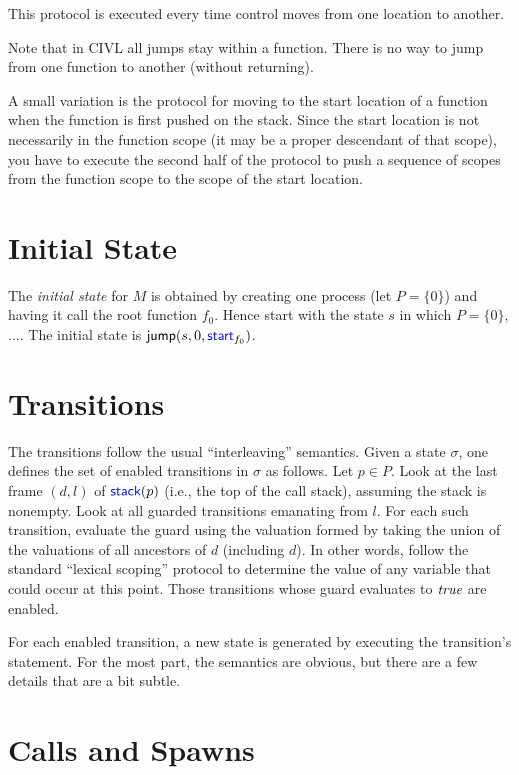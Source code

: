 This protocol is executed every time control moves from one location
to another.

Note that in CIVL all jumps stay within a function.  There is no
way to jump from one function to another (without returning).

A small variation is the protocol for moving to the start location of
a function when the function is first pushed on the stack. Since the
start location is not necessarily in the function scope (it may be a
proper descendant of that scope), you have to execute the second half
of the protocol to push a sequence of scopes from the function scope
to the scope of the start location.

\section{Initial State}

The \emph{initial state} for $M$ is obtained by creating one process
(let $P=\{0\}$) and having it call the root function $f_0$. 
Hence start with the state $s$ in which $P=\{0\}$, $\ldots$.
The initial state is $\textup{\textsf{jump}}(s,0,\textup{\textsf{\textcolor{blue}{start}}}_{f_0})$.

\section{Transitions}

The transitions follow the usual ``interleaving'' semantics. Given a
state $\sigma$, one defines the set of enabled transitions in $\sigma$
as follows. Let $p\in P$. Look at the last frame $(d,l)$ of
$\textup{\textsf{\textcolor{blue}{stack}}}(p)$ (i.e., the top of the call stack), assuming the stack is
nonempty. Look at all guarded transitions emanating from $l$. For each
such transition, evaluate the guard using the valuation formed by
taking the union of the valuations of all ancestors of $d$ (including
$d$). In other words, follow the standard ``lexical scoping'' protocol
to determine the value of any variable that could occur at this point.
Those transitions whose guard evaluates to $\emph{true}$ are enabled.

For each enabled transition, a new state is generated by executing
the transition's statement.  For the most part, the semantics are obvious,
but there are a few details that are a bit subtle.

\section{Calls and Spawns}

